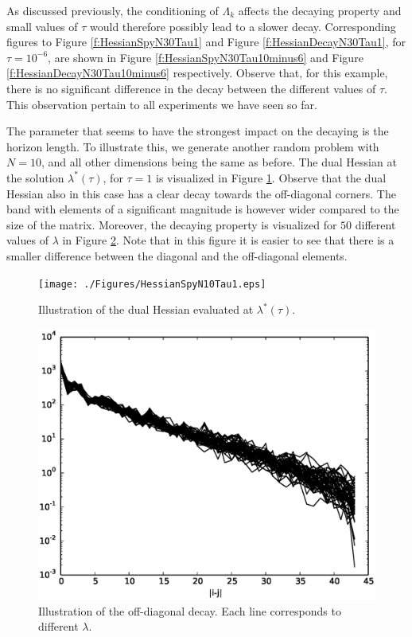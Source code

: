 As discussed previously, the conditioning of $\Lambda_k$ affects the decaying property and small values of $\tau$ would therefore possibly lead to a slower decay. Corresponding figures to Figure \ref{f:HessianSpyN30Tau1} and Figure \ref{f:HessianDecayN30Tau1}, for $\tau = 10^{-6}$, are shown in Figure \ref{f:HessianSpyN30Tau10minus6} and Figure \ref{f:HessianDecayN30Tau10minus6} respectively. Observe that, for this example, there is no significant difference in the decay between the different values of $\tau$. This observation pertain to all experiments we have seen so far.

The parameter that seems to have the strongest impact on the decaying is the horizon length. To illustrate this, we generate another random problem with $N=10$, and all other dimensions being the same as before. The dual Hessian at the solution $\lambda^*(\tau)$, for $\tau=1$ is visualized in Figure \ref{f:HessianSpyN10Tau1}. Observe that the dual Hessian also in this case has a clear decay towards the off-diagonal corners. The band with elements of a significant magnitude is however wider compared to the size of the matrix. Moreover, the decaying property is visualized for $50$ different values of $\lambda$ in Figure \ref{f:HessianDecayN10Tau1}. Note that in this figure it is easier to see that there is a smaller difference between the diagonal and the off-diagonal elements.

\begin{figure}[h]
  \centering
  \texttt{[image: ./Figures/HessianSpyN10Tau1.eps]}
  \caption{Illustration of the dual Hessian evaluated at $\lambda^*(\tau)$.}
  \label{f:HessianSpyN10Tau1}
\end{figure}

\begin{figure}[h]
  \centering
  \includegraphics[scale=0.4]{./Figures/HessianDecayN10Tau1.eps}
  \caption{Illustration of the off-diagonal decay. Each line corresponds to different $\lambda$.}
  \label{f:HessianDecayN10Tau1}
\end{figure}

